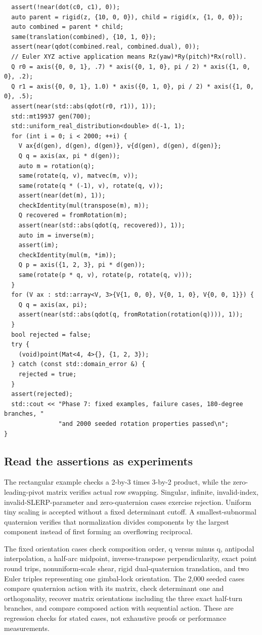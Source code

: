 \begin{verbatim}
  assert(!near(dot(c0, c1), 0));
  auto parent = rigid(z, {10, 0, 0}), child = rigid(x, {1, 0, 0});
  auto combined = parent * child;
  same(translation(combined), {10, 1, 0});
  assert(near(qdot(combined.real, combined.dual), 0));
  // Euler XYZ active application means Rz(yaw)*Ry(pitch)*Rx(roll).
  Q r0 = axis({0, 0, 1}, .7) * axis({0, 1, 0}, pi / 2) * axis({1, 0, 0}, .2);
  Q r1 = axis({0, 0, 1}, 1.0) * axis({0, 1, 0}, pi / 2) * axis({1, 0, 0}, .5);
  assert(near(std::abs(qdot(r0, r1)), 1));
  std::mt19937 gen(700);
  std::uniform_real_distribution<double> d(-1, 1);
  for (int i = 0; i < 2000; ++i) {
    V ax{d(gen), d(gen), d(gen)}, v{d(gen), d(gen), d(gen)};
    Q q = axis(ax, pi * d(gen));
    auto m = rotation(q);
    same(rotate(q, v), matvec(m, v));
    same(rotate(q * (-1), v), rotate(q, v));
    assert(near(det(m), 1));
    checkIdentity(mul(transpose(m), m));
    Q recovered = fromRotation(m);
    assert(near(std::abs(qdot(q, recovered)), 1));
    auto im = inverse(m);
    assert(im);
    checkIdentity(mul(m, *im));
    Q p = axis({1, 2, 3}, pi * d(gen));
    same(rotate(p * q, v), rotate(p, rotate(q, v)));
  }
  for (V ax : std::array<V, 3>{V{1, 0, 0}, V{0, 1, 0}, V{0, 0, 1}}) {
    Q q = axis(ax, pi);
    assert(near(std::abs(qdot(q, fromRotation(rotation(q)))), 1));
  }
  bool rejected = false;
  try {
    (void)point(Mat<4, 4>{}, {1, 2, 3});
  } catch (const std::domain_error &) {
    rejected = true;
  }
  assert(rejected);
  std::cout << "Phase 7: fixed examples, failure cases, 180-degree branches, "
               "and 2000 seeded rotation properties passed\n";
}
\end{verbatim}

\subsection{Read the assertions as experiments}\label{02-foundations-ii-ch038-read-the-assertions-as-experiments}

The rectangular example checks a 2-by-3 times 3-by-2 product, while the zero-leading-pivot matrix verifies actual row swapping. Singular, infinite, invalid-index, invalid-SLERP-parameter and zero-quaternion cases exercise rejection. Uniform tiny scaling is accepted without a fixed determinant cutoff. A smallest-subnormal quaternion verifies that normalization divides components by the largest component instead of first forming an overflowing reciprocal.

The fixed orientation cases check composition order, q versus minus q, antipodal interpolation, a half-arc midpoint, inverse-transpose perpendicularity, exact point round trips, nonuniform-scale shear, rigid dual-quaternion translation, and two Euler triples representing one gimbal-lock orientation. The 2,000 seeded cases compare quaternion action with its matrix, check determinant one and orthogonality, recover matrix orientations including the three exact half-turn branches, and compare composed action with sequential action. These are regression checks for stated cases, not exhaustive proofs or performance measurements.

